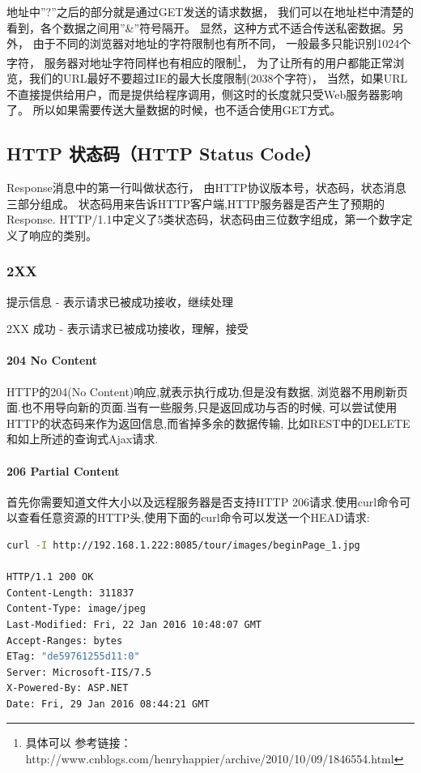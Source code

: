 \documentclass{book}
\begin{document}
地址中”?”之后的部分就是通过GET发送的请求数据，
我们可以在地址栏中清楚的看到，各个数据之间用”\&”符号隔开。
显然，这种方式不适合传送私密数据。另外，
由于不同的浏览器对地址的字符限制也有所不同，
一般最多只能识别1024个字符，
服务器对地址字符同样也有相应的限制\footnote{具体可以 参考链接：
http://www.cnblogs.com/henryhappier/archive/2010/10/09/1846554.html}，
为了让所有的用户都能正常浏览，我们的URL最好不要超过IE的最大长度限制(2038个字符)，
当然，如果URL不直接提供给用户，而是提供给程序调用，侧这时的长度就只受Web服务器影响了。
所以如果需要传送大量数据的时候，也不适合使用GET方式。

\subsection{HTTP 状态码（HTTP Status Code）}

Response消息中的第一行叫做状态行，
由HTTP协议版本号，状态码，状态消息三部分组成。
状态码用来告诉HTTP客户端,HTTP服务器是否产生了预期的Response.
HTTP/1.1中定义了5类状态码，状态码由三位数字组成，第一个数字定义了响应的类别。

\subsubsection{2XX}

提示信息 - 表示请求已被成功接收，继续处理

2XX  成功 - 表示请求已被成功接收，理解，接受

\paragraph{204 No Content}HTTP的204(No Content)响应,就表示执行成功,但是没有数据, 浏览器不用刷新页面.也不用导向新的页面.当有一些服务,只是返回成功与否的时候,
可以尝试使用HTTP的状态码来作为返回信息,而省掉多余的数据传输,
比如REST中的DELETE和如上所述的查询式Ajax请求.

\paragraph{206 Partial Content}首先你需要知道文件大小以及远程服务器是否支持HTTP 206请求.使用curl命令可以查看任意资源的HTTP头,使用下面的curl命令可以发送一个HEAD请求:

\begin{lstlisting}[language=Bash]
curl -I http://192.168.1.222:8085/tour/images/beginPage_1.jpg

HTTP/1.1 200 OK
Content-Length: 311837
Content-Type: image/jpeg
Last-Modified: Fri, 22 Jan 2016 10:48:07 GMT
Accept-Ranges: bytes
ETag: "de59761255d11:0"
Server: Microsoft-IIS/7.5
X-Powered-By: ASP.NET
Date: Fri, 29 Jan 2016 08:44:21 GMT
\end{lstlisting}
\end{document}
